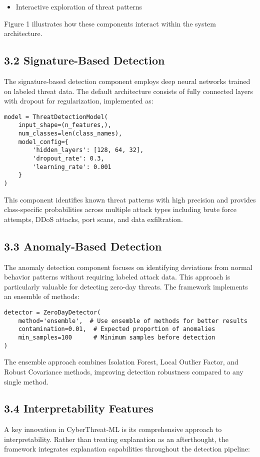 \documentclass[12pt]{article}
\begin{document}
\begin{itemize}
\item Interactive exploration of threat patterns
\end{itemize}

Figure 1 illustrates how these components interact within the system architecture.

\subsection{3.2 Signature-Based Detection}
The signature-based detection component employs deep neural networks trained on labeled threat data. The default architecture consists of fully connected layers with dropout for regularization, implemented as:

\begin{lstlisting}
model = ThreatDetectionModel(
    input_shape=(n_features,),
    num_classes=len(class_names),
    model_config={
        'hidden_layers': [128, 64, 32],
        'dropout_rate': 0.3,
        'learning_rate': 0.001
    }
)
\end{lstlisting}

This component identifies known threat patterns with high precision and provides class-specific probabilities across multiple attack types including brute force attempts, DDoS attacks, port scans, and data exfiltration.

\subsection{3.3 Anomaly-Based Detection}
The anomaly detection component focuses on identifying deviations from normal behavior patterns without requiring labeled attack data. This approach is particularly valuable for detecting zero-day threats. The framework implements an ensemble of methods:

\begin{lstlisting}
detector = ZeroDayDetector(
    method='ensemble',  # Use ensemble of methods for better results
    contamination=0.01,  # Expected proportion of anomalies
    min_samples=100      # Minimum samples before detection
)
\end{lstlisting}

The ensemble approach combines Isolation Forest, Local Outlier Factor, and Robust Covariance methods, improving detection robustness compared to any single method.

\subsection{3.4 Interpretability Features}
A key innovation in CyberThreat-ML is its comprehensive approach to interpretability. Rather than treating explanation as an afterthought, the framework integrates explanation capabilities throughout the detection pipeline:
\end{document}
